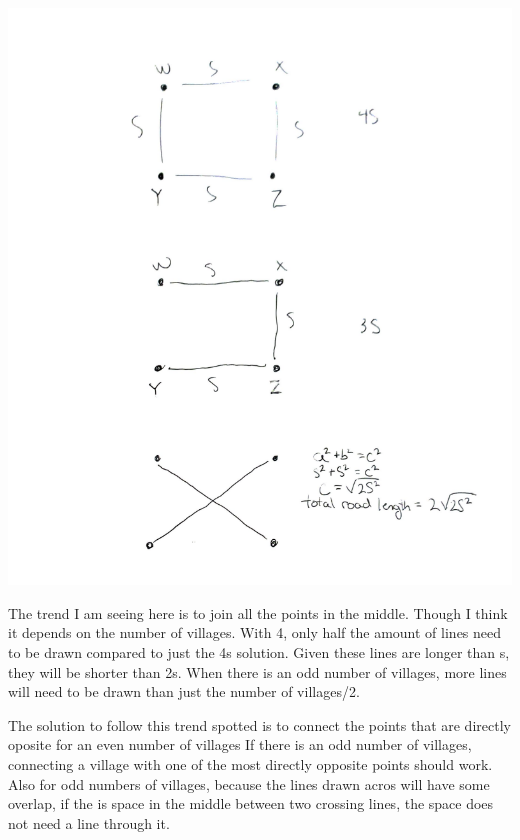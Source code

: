 \documentclass[12pt]{article}
\begin{document}
\vspace{5mm}

\includegraphics[scale=.75]{table1}

\vspace{5mm}

The trend I am seeing here is to join all the points in the middle. Though I think it depends on the number of villages.
With 4, only half the amount of lines need to be drawn compared to just the 4s solution. Given these lines are longer than s, they will be shorter than 2s.
When there is an odd number of villages, more lines will need to be drawn than just the number of villages/2.

\vspace{5mm}

The solution to follow this trend spotted is to connect the points that are directly oposite for an even number of villages
If there is an odd number of villages, connecting a village with one of the most directly opposite points should work.
Also for odd numbers of villages, because the lines drawn acros will have some overlap, if the is space in the middle between two crossing lines, the space does not need a line through it.
\end{document}
